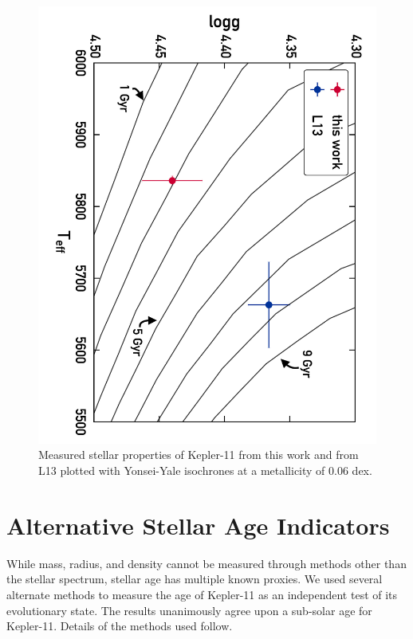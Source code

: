\documentclass[oneside]{emulateapj}
\begin{document}
\begin{figure}
\centering
\includegraphics[angle=270,width=\columnwidth]{isochrones_annotated}
\caption{Measured stellar properties of Kepler-11 from this work and from L13 plotted with Yonsei-Yale isochrones at a metallicity of 0.06 dex.}
\label{fig:isochrones}
\end{figure}

\section{Alternative Stellar Age Indicators}
\label{s:ages}

While mass, radius, and density cannot be measured through methods other than the stellar spectrum, stellar age has multiple known proxies. We used several alternate methods to measure the age of Kepler-11 as an independent test of its evolutionary state. The results unanimously agree upon a sub-solar age for Kepler-11. Details of the methods used follow.
\end{document}
